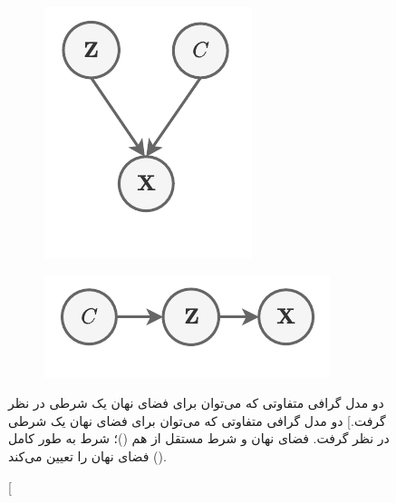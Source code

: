 \begin{figure}[h]
    \centering
    \begin{subfigure}{0.1\textheight}
        \centering
        \includegraphics[width=1.\textwidth]{images/pgm_disentangle.pdf}
        \caption{}
        \label{fig:chap3:latent_pgm_d}
    \end{subfigure}
    \hspace{1cm}
    \begin{subfigure}{0.2\textheight}
        \centering
        \includegraphics[width=1.\textwidth]{images/pgm_hierarchical.pdf}
        \caption{}
        \label{fig:chap3:latent_pgm_h}
    \end{subfigure}
    \caption
    [دو مدل گرافی متفاوتی که می‌توان برای فضای نهان یک \task{} شرطی در نظر گرفت.]
    {
        دو مدل گرافی متفاوتی که می‌توان برای فضای نهان یک \task{} شرطی در نظر گرفت.
        فضای نهان و شرط مستقل از هم 
        ()؛
        شرط به طور کامل فضای نهان را تعیین می‌کند
        ().
    }
    \label{fig:chap3:latent_pgm}
\end{figure}

